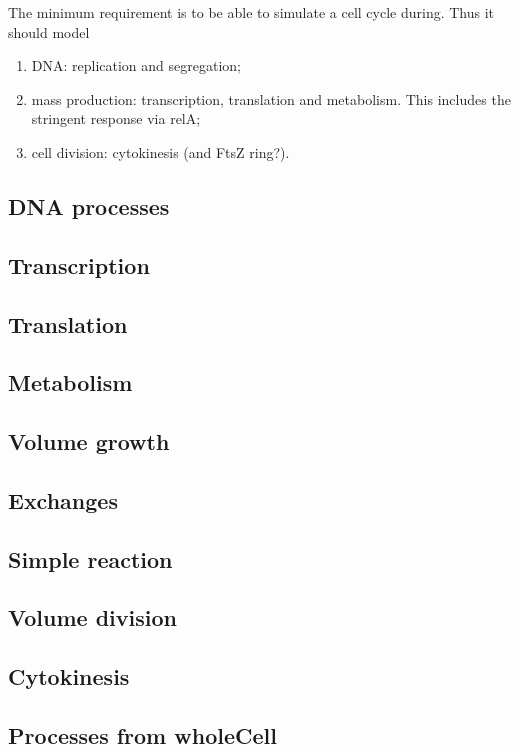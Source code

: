 The minimum requirement is to be able to simulate a cell cycle during. Thus it should model
\begin{enumerate}
  \item DNA: replication and segregation;
  \item mass production: transcription, translation and metabolism. This includes the stringent response via relA;
  \item cell division: cytokinesis (and FtsZ ring?).
\end{enumerate}


\subsection{DNA processes}


\subsection{Transcription}


\subsection{Translation}


\subsection{Metabolism}


\subsection{Volume growth}


\subsection{Exchanges}


\subsection{Simple reaction}


\subsection{Volume division}


\subsection{Cytokinesis}


\subsection{Processes from wholeCell}

